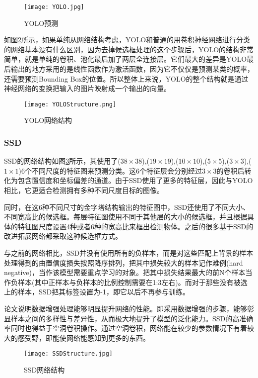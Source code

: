 \begin{figure}
	\center
	{\texttt{[image: YOLO.jpg]}}
	\caption{YOLO预测}
	\label{YOLO}
\end{figure}

如图\ref{YOLOStructure}所示，如果单纯从网络结构考虑，YOLO和普通的用卷积神经网络进行分类的网络基本没有什么区别，因为去掉候选框处理的这个步骤后，YOLO的结构非常简单，就是单纯的卷积、池化最后加了两层全连接层。它们最大的差异是YOLO最后输出的地方采用的是线性函数作为激活函数，因为它不仅仅是预测某类的概率，还需要预测Bounding Box的位置。所以整体上来说，YOLO的整个结构就是通过神经网络的变换把输入的图片映射成一个输出的向量。


\begin{figure}
	\center
	{\texttt{[image: YOLOStructure.png]}}
	\caption{YOLO网络结构}
	\label{YOLOStructure}
\end{figure}

\subsubsection{SSD}

SSD\cite{SSD}的网络结构如图\ref{SSDStructure}所示，其使用了($38\times 38$),($19\times 19$),($10\times 10$),($5\times 5$),($3\times 3$),($1\times 1$)6个不同尺度的特征图来预测分类。这6个特征层会分别经过$3\times 3$的卷积后转化为包含置信度和坐标偏差的通道。由于SSD使用了更多的特征层，因此与YOLO\cite{YOLO}相比，它更适合检测拥有多种不同尺度目标的图像。

同时，在这6种不同尺寸的金字塔结构输出的特征图中，SSD还使用了不同大小、不同宽高比的候选框。每层特征图使用不同于其他层的大小的候选框，并且根据具体的特征图尺度设置4种或者6种的宽高比来框出检测物体。之后的很多基于SSD的改进拓展网络都采取这种候选框方式。

与之前的网络相比，SSD并没有使用所有的负样本，而是对这些匹配上背景的样本处理得到的由置信度损失按照降序排列，把其中损失较大的样本记作难例(hard negative)，当作该模型需要重点学习的对象。把其中损失结果最大的前N个样本当作负样本(其中正样本与负样本的比例控制需要在1:3左右)。而对于那些没有被选上的样本，SSD把其标签设置为-1，即它以后不再参与训练。

论文说明数据增强处理能够明显提升网络的性能。即采用数据增强的步骤，能够彰显样本之间的多样性与差异性，从而极大地提升了模型的泛化能力。SSD的高准确率同时也得益于空洞卷积操作。通过空洞卷积，网络能在较少的参数情况下有着较大的感受野，即能使网络能感知到更多的东西。

\begin{figure}
	\center
	{\texttt{[image: SSDStructure.jpg]}}
	\caption{SSD网络结构}
	\label{SSDStructure}
\end{figure}

